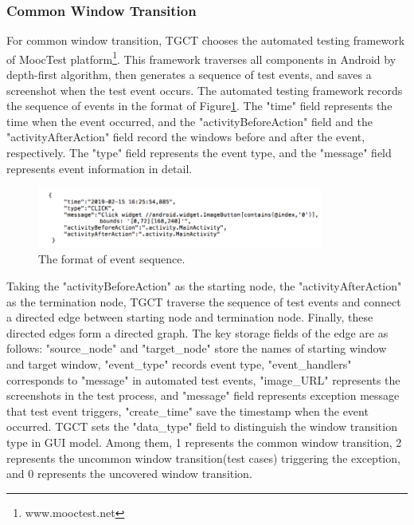 \subsubsection{Common Window Transition}
For common window transition, TGCT chooses the automated testing framework of MoocTest platform\footnote{www.mooctest.net}. This framework traverses all components in Android by depth-first algorithm, then generates a sequence of test events, and saves a screenshot when the test event occurs. The automated testing framework records the sequence of events in the format of Figure\ref{fig:foramt}. The "time" field represents the time when the event occurred, and the "activityBeforeAction" field and the "activityAfterAction" field record the windows before and after the event, respectively. The "type" field represents the event type, and the "message" field represents event information in detail.
\begin{figure}[htbp]
\centering
\centerline{\includegraphics[width=\columnwidth,height=2cm]{fig/4.png}}
\caption{The format of event sequence.}
\label{fig:foramt}
\end{figure}

Taking the "activityBeforeAction" as the starting node, the "activityAfterAction" as the termination node, TGCT traverse the sequence of test events and connect a directed edge between starting node and termination node. Finally, these directed edges form a directed graph.
The key storage fields of the edge are as follows: "source\_node" and "target\_node" store the names of starting window and target window, "event\_type" records event type, "event\_handlers" corresponds to "message" in automated test events, "image\_URL" represents the screenshots in the test process, and "message" field represents exception message that test event triggers, "create\_time" save the timestamp when the event occurred. TGCT sets the "data\_type" field to distinguish the window transition type in GUI model. Among them, 1 represents the common window transition, 2 represents the uncommon window transition(test cases) triggering the exception, and 0 represents the uncovered window transition.


